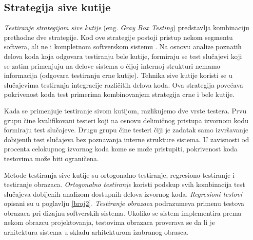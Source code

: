 \documentclass[12pt,oneside]{memoir}
\begin{document}
\subsection{Strategija sive kutije}

\emph{Testiranje strategijom sive kutije} (eng. \textit{Gray Box Testing}) predstavlja kombinaciju prethodne dve strategije. Kod ove strategije postoji pristup nekom segmentu softvera, ali ne i kompletnom softverskom sistemu \cite{GrayBoxTesting}. Na osnovu analize poznatih delova koda koja odgovara testiranju bele kutije, formiraju se test slučajevi koji se zatim primenjuju na delove sistema o čijoj internoj strukturi nemamo informacija (odgovara testiranju crne kutije). Tehnika sive kutije koristi se u slučajevima testiranja integracije različitih delova koda. Ova strategija povećava pokrivenost koda test primerima kombinovanjem strategija crne i bele kutije. 
\par
Kada se primenjuje testiranje sivom kutijom, razlikujemo dve vrste testera. Prvu grupu čine kvalifikovani testeri koji na osnovu delimičnog pristupa izvornom kodu formiraju test slučajeve. Drugu grupu čine testeri čiji je zadatak samo izvršavanje dobijenih test slučajeva bez poznavanja interne strukture sistema. 
U zavisnosti od procenta celokupnog izvornog koda kome se može pristupiti, pokrivenost koda testovima može biti ograničena. 
\par
Metode testiranja sive kutije su ortogonalno testiranje, regresiono testiranje i testiranje obrazaca.
\emph{Ortogonalno testiranje} koristi podskup svih kombinacija test slučajeva  dobijenih analizom dostupnih delova izvornog koda.
\emph{Regresioni testovi} opisani su u poglavlju \ref{broj2}. \emph{Testiranje obrazaca} podrazumeva primenu testova obrazaca pri dizajnu softverskih sistema.
Ukoliko se sistem implementira prema nekom obrazcu projektovanja, testovima obrazaca proverava se da li je arhitektura sistema u skladu arhitekturom izabranog obrasca.
\end{document}
